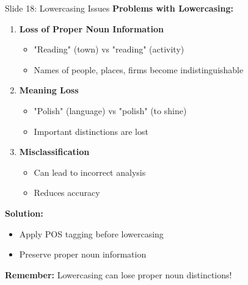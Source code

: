 \documentclass[8pt]{beamer}
\begin{document}
	\begin{frame}{Slide 18: Lowercasing Issues}
		\fontsize{6.5}{7.5}\selectfont
		\textbf{Problems with Lowercasing:}
		\begin{enumerate}
			\item \textbf{Loss of Proper Noun Information}
			\begin{itemize}
				\item "Reading" (town) vs "reading" (activity)
				\item Names of people, places, firms become indistinguishable
			\end{itemize}
			\item \textbf{Meaning Loss}
			\begin{itemize}
				\item "Polish" (language) vs "polish" (to shine)
				\item Important distinctions are lost
			\end{itemize}
			\item \textbf{Misclassification}
			\begin{itemize}
				\item Can lead to incorrect analysis
				\item Reduces accuracy
			\end{itemize}
		\end{enumerate}
		
		\vspace{0.1cm}
		\textbf{Solution:}
		\begin{itemize}
			\item Apply POS tagging before lowercasing
			\item Preserve proper noun information
		\end{itemize}
		
		\textcolor{myblue}{\textbf{Remember:}} Lowercasing can lose \textcolor{myblue}{proper noun distinctions}!
	\end{frame}
	
\end{document}
